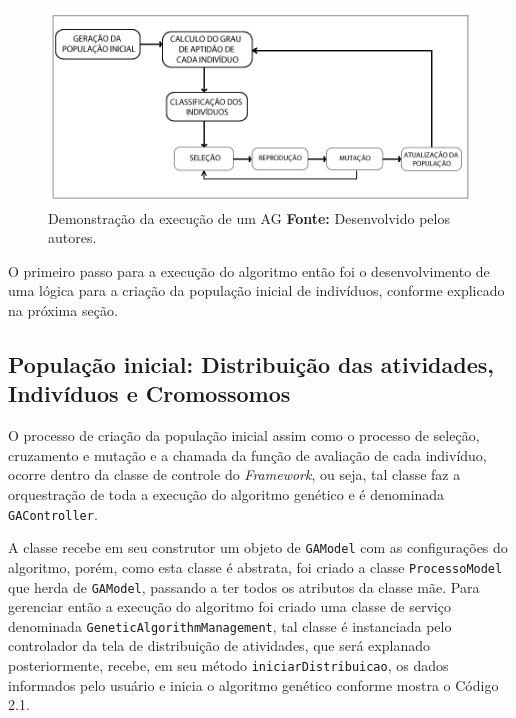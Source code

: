\begin{figure}[h!]
	\centerline{\includegraphics[scale=0.6]{./imagens/algoritimos_geneticos.jpg}}
	\caption[Demonstração da execução de um AG]
	{Demonstração da execução de um AG \textbf{Fonte:} Desenvolvido pelos autores.}
	\label{fig:exemplo1}
\end{figure}

\newpage


\par O primeiro passo para a execução do algoritmo então foi o desenvolvimento de uma lógica para a criação
da população inicial de indivíduos, conforme explicado na próxima seção.

\subsection {População inicial: Distribuição das atividades, Indivíduos e Cromossomos}
\par O processo de criação da população inicial assim como o processo de seleção, cruzamento e mutação e a chamada da 
função de avaliação de cada indivíduo, ocorre dentro da classe de controle do \textit{Framework}, ou seja, tal classe faz a 
orquestração de toda a execução do algoritmo genético e é denominada \texttt{GAController}.

\par A classe recebe em seu construtor um objeto de \texttt{GAModel} com as configurações do algoritmo, porém, como esta classe 
é abstrata, foi criado a classe \texttt{ProcessoModel} que herda de \texttt{GAModel}, passando a ter todos os atributos
da classe mãe. Para gerenciar então a execução do algoritmo foi criado uma classe de serviço denominada 
\texttt{GeneticAlgorithmManagement}, tal classe é instanciada pelo controlador da tela de distribuição de atividades, que será
explanado posteriormente, recebe, em seu método \texttt{iniciarDistribuicao}, os dados informados pelo 
usuário e inicia o algoritmo genético conforme mostra o Código 2.1.


